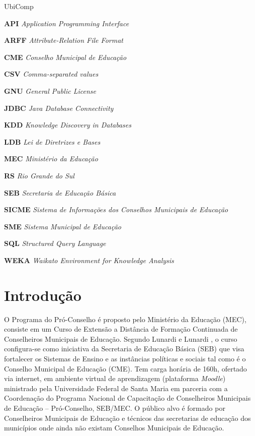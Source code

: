 \documentclass[tg]{mdtufsm}
\begin{document}
\listoffigures
\listoftables
\listofalgorithms

\begin{listofabbrv}{UbiComp}
	\item [\textbf{API}] \textit{Application Programming Interface}
	\item [\textbf{ARFF}] \textit{Attribute-Relation File Format}
	\item [\textbf{CME}] \textit{Conselho Municipal de Educação}
	\item [\textbf{CSV}] \textit{Comma-separated values}
	\item [\textbf{GNU}] \textit{General Public License}
	\item [\textbf{JDBC}] \textit{Java Database Connectivity}
	\item [\textbf{KDD}] \textit{Knowledge Discovery in Databases}
	\item [\textbf{LDB}] \textit{Lei de Diretrizes e Bases}
	\item [\textbf{MEC}] \textit{Ministério da Educação}
	\item [\textbf{RS}] \textit{Rio Grande do Sul}
	\item [\textbf{SEB}] \textit{Secretaria de Educação Básica}
	\item [\textbf{SICME}] \textit{Sistema de Informações dos Conselhos Municipais de Educação}
	\item [\textbf{SME}] \textit{Sistema Municipal de Educação}
	\item [\textbf{SQL}] \textit{Structured Query Language}
	\item [\textbf{WEKA}] \textit{Waikato Environment for Knowledge Analysis}
\end{listofabbrv}

\tableofcontents
\newpage


\chapter{Introdução}

O Programa do Pró-Conselho é proposto pelo Ministério da Educação (MEC), consiste em um Curso de Extensão a Distância de Formação Continuada de Conselheiros Municipais de Educação. Segundo Lunardi e Lunardi \citeyearpar{Lunardi-2014}, o curso configura-se como iniciativa da Secretaria de Educação Básica (SEB) que visa fortalecer os Sistemas de Ensino e as instâncias políticas e sociais tal como é o Conselho Municipal de Educação (CME). Tem carga horária de 160h, ofertado via internet, em ambiente virtual de aprendizagem (plataforma \textit{Moodle}) ministrado pela Universidade Federal de Santa Maria em parceria com a Coordenação do Programa Nacional de Capacitação de Conselheiros Municipais de Educação – Pró-Conselho, SEB/MEC. O público alvo é formado por Conselheiros Municipais de Educação e técnicos das secretarias de educação dos municípios onde ainda não existam Conselhos Municipais de Educação. 
\end{document}
